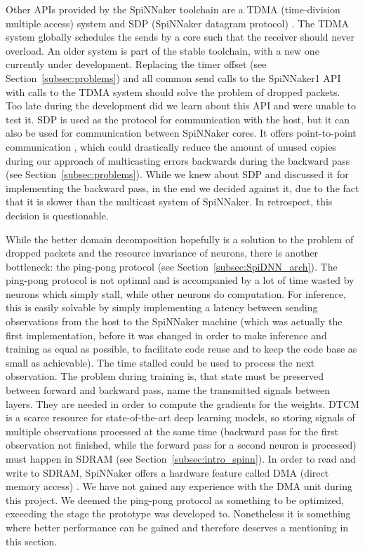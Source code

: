 \documentclass[]{article}
\begin{document}
Other APIs provided by the SpiNNaker toolchain are a TDMA
(time-division multiple access) system and SDP (SpiNNaker datagram
protocol) \citep{furber_et_al_2014}.
The TDMA system globally schedules the sends by a core such that the
receiver should never overload.
An older system is part of the stable toolchain, with a new one
currently under development.
Replacing the timer offset (see Section~\ref{subsec:problems}) and all
common send calls to the SpiNNaker1 API with calls to the TDMA system
should solve the problem of dropped packets.
Too late during the development did we learn about this API and were
unable to test it.
SDP is used as the protocol for communication with the host, but it
can also be used for communication between SpiNNaker cores.
It offers point-to-point communication \citep{furber_et_al_2014},
which could drastically reduce the amount of unused copies during our
approach of multicasting errors backwards during the backward pass
(see Section~\ref{subsec:problems}).
While we knew about SDP and discussed it for implementing the backward
pass, in the end we decided against it, due to the fact that it is
slower than the multicast system of SpiNNaker.
In retrospect, this decision is questionable.


While the better domain decomposition hopefully is a solution
to the problem of dropped packets and the resource invariance of
neurons, there is another bottleneck: the ping-pong protocol
(see Section~\ref{subsec:SpiDNN_arch}).
The ping-pong protocol is not optimal and is accompanied by a lot
of time wasted by neurons which simply stall, while other neurons
do computation.
For inference, this is easily solvable by simply implementing a
latency between sending observations from the host to the SpiNNaker
machine (which was actually the first implementation, before it was
changed in order to make inference and training as equal as possible,
to facilitate code reuse and to keep the code base as small as
achievable).
The time stalled could be used to process the next observation.
The problem during training is, that state must be preserved between
forward and backward pass, name the transmitted signals between
layers.
They are needed in order to compute the gradients for the weights.
DTCM is a scarce resource for state-of-the-art deep learning models,
so storing signals of multiple observations processed at the same time
(backward pass for the first observation not finished, while the
forward pass for a second neuron is processed) must happen in SDRAM
(see Section~\ref{subsec:intro_spinn}).
In order to read and write to SDRAM, SpiNNaker offers a hardware
feature called DMA (direct memory access) \citep{furber_et_al_2020}.
We have not gained any experience with the DMA unit during this
project.
We deemed the ping-pong protocol as something to be optimized,
exceeding the stage the prototype was developed to.
Nonetheless it is something where better performance can be gained
and therefore deserves a mentioning in this section.
\end{document}
